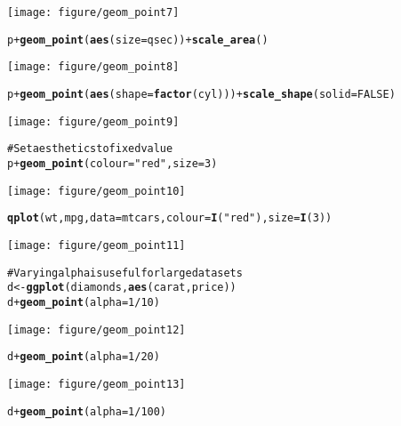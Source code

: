 \documentclass[a4paper,titlepage]{tufte-handout}\usepackage{graphicx, color}
\makeatletter
\def\maxwidth{ %
  \ifdim\Gin@nat@width>\linewidth
    \linewidth
  \else
    \Gin@nat@width
  \fi
}
\newcommand{\hlfunctioncall}[1]{\textcolor[rgb]{0.501960784313725,0,0.329411764705882}{\textbf{#1}}}%
\newcommand{\hlstring}[1]{\textcolor[rgb]{0.6,0.6,1}{#1}}%
\newcommand{\hlcomment}[1]{\textcolor[rgb]{0.180392156862745,0.6,0.341176470588235}{#1}}%
\newenvironment{kframe}{%
 \def\at@end@of@kframe{}%
 \ifinner\ifhmode%
  \def\at@end@of@kframe{\end{minipage}}%
  \begin{minipage}{\columnwidth}%
 \fi\fi%
 \def\FrameCommand##1{\hskip\@totalleftmargin \hskip-\fboxsep
 \colorbox{shadecolor}{##1}\hskip-\fboxsep
     \hskip-\linewidth \hskip-\@totalleftmargin \hskip\columnwidth}%
 \MakeFramed {\advance\hsize-\width
   \@totalleftmargin\z@ \linewidth\hsize
   \@setminipage}}%
 {\par\unskip\endMakeFramed%
 \at@end@of@kframe}
\newenvironment{knitrout}{}{} %
\makeatother
\begin{document}
\begin{knitrout}
\begin{kframe}
\begin{alltt}
\end{alltt}
\end{kframe}\texttt{[image: figure/geom\_point7]} \begin{kframe}\begin{alltt}
p + \hlfunctioncall{geom_point}(\hlfunctioncall{aes}(size = qsec)) + \hlfunctioncall{scale_area}()
\end{alltt}
\end{kframe}\texttt{[image: figure/geom\_point8]} \begin{kframe}\begin{alltt}
p + \hlfunctioncall{geom_point}(\hlfunctioncall{aes}(shape = \hlfunctioncall{factor}(cyl))) + \hlfunctioncall{scale_shape}(solid = FALSE)
\end{alltt}
\end{kframe}\texttt{[image: figure/geom\_point9]} \begin{kframe}\begin{alltt}
\hlcomment{# Set aesthetics to fixed value}
p + \hlfunctioncall{geom_point}(colour = \hlstring{"red"}, size = 3)
\end{alltt}
\end{kframe}\texttt{[image: figure/geom\_point10]} \begin{kframe}\begin{alltt}
\hlfunctioncall{qplot}(wt, mpg, data = mtcars, colour = \hlfunctioncall{I}(\hlstring{"red"}), size = \hlfunctioncall{I}(3))
\end{alltt}
\end{kframe}\texttt{[image: figure/geom\_point11]} \begin{kframe}\begin{alltt}
\hlcomment{# Varying alpha is useful for large datasets}
d <- \hlfunctioncall{ggplot}(diamonds, \hlfunctioncall{aes}(carat, price))
d + \hlfunctioncall{geom_point}(alpha = 1/10)
\end{alltt}
\end{kframe}\texttt{[image: figure/geom\_point12]} \begin{kframe}\begin{alltt}
d + \hlfunctioncall{geom_point}(alpha = 1/20)
\end{alltt}
\end{kframe}\texttt{[image: figure/geom\_point13]} \begin{kframe}\begin{alltt}
d + \hlfunctioncall{geom_point}(alpha = 1/100)

\end{alltt}
\end{kframe}
\end{knitrout}
\end{document}
